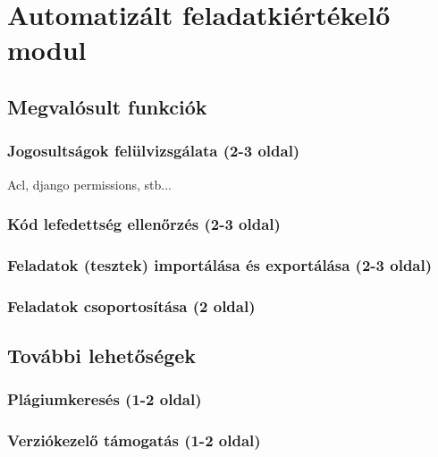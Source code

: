 \chapter{Automatizált feladatkiértékelő modul}\label{chapter:exercise}

\section{Megvalósult funkciók}
\subsection{Jogosultságok felülvizsgálata (2-3 oldal)}\label{subsection:permissions}
Acl, django permissions, stb...

\subsection{Kód lefedettség ellenőrzés (2-3 oldal)}

\subsection{Feladatok (tesztek) importálása és exportálása (2-3 oldal)}

\subsection{Feladatok csoportosítása (2 oldal)}

\section{További lehetőségek}

\subsection{Plágiumkeresés (1-2 oldal)}

\subsection{Verziókezelő támogatás (1-2 oldal)}